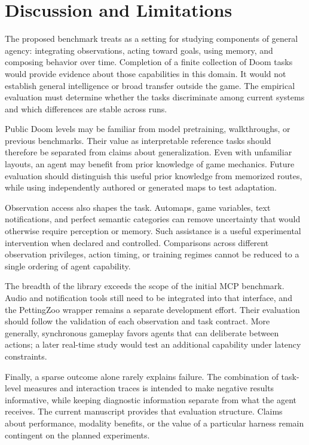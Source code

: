 \section{Discussion and Limitations}
The proposed benchmark treats \vzd{} as a setting for studying components of general agency: integrating observations, acting toward goals, using memory, and composing behavior over time. Completion of a finite collection of Doom tasks would provide evidence about those capabilities in this domain. It would not establish general intelligence or broad transfer outside the game. The empirical evaluation must determine whether the tasks discriminate among current systems and which differences are stable across runs.

Public Doom levels may be familiar from model pretraining, walkthroughs, or previous benchmarks. Their value as interpretable reference tasks should therefore be separated from claims about generalization. Even with unfamiliar layouts, an agent may benefit from prior knowledge of game mechanics. Future evaluation should distinguish this useful prior knowledge from memorized routes, while using independently authored or generated maps to test adaptation.

Observation access also shapes the task. Automaps, game variables, text notifications, and perfect semantic categories can remove uncertainty that would otherwise require perception or memory. Such assistance is a useful experimental intervention when declared and controlled. Comparisons across different observation privileges, action timing, or training regimes cannot be reduced to a single ordering of agent capability.

The breadth of the library exceeds the scope of the initial MCP benchmark. Audio and notification tools still need to be integrated into that interface, and the PettingZoo wrapper remains a separate development effort. Their evaluation should follow the validation of each observation and task contract. More generally, synchronous gameplay favors agents that can deliberate between actions; a later real-time study would test an additional capability under latency constraints.

Finally, a sparse outcome alone rarely explains failure. The combination of task-level measures and interaction traces is intended to make negative results informative, while keeping diagnostic information separate from what the agent receives. The current manuscript provides that evaluation structure. Claims about performance, modality benefits, or the value of a particular harness remain contingent on the planned experiments.

